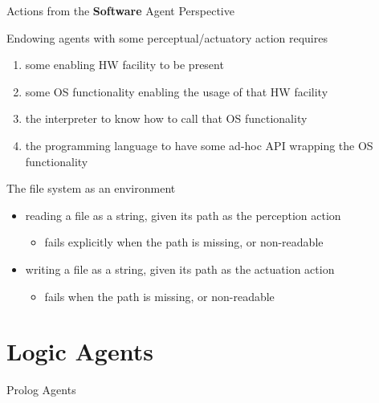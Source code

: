 \documentclass[presentation]{beamer}\mode<presentation>{\usetheme{AMSBolognaFC}}
\begin{document}
\begin{frame}[allowframebreaks]{Actions from the \textbf{Software} Agent Perspective}

    \begin{alertblock}{Endowing agents with some perceptual/actuatory action requires}
        \begin{enumerate}
            \item some enabling HW facility to be present
            \item some OS functionality enabling the usage of that HW facility
            \item the interpreter to know how to call that OS functionality
            \item the programming language to have some ad-hoc API wrapping the OS functionality
        \end{enumerate}
    \end{alertblock}

    \begin{exampleblock}{The file system as an environment}
        \begin{itemize}
            \item \alert{reading} a file as a string, given its path as the \alert{perception} action
            \begin{itemize}
                \item fails explicitly  when the path is missing, or non-readable
            \end{itemize}

            \item \alert{writing} a file as a string, given its path as the \alert{actuation} action
            \begin{itemize}
                \item fails when the path is missing, or non-readable
            \end{itemize}
        \end{itemize}
    \end{exampleblock}
\end{frame}

\section{Logic Agents}

\begin{frame}[allowframebreaks]{Prolog Agents}

\end{frame}
\end{document}

